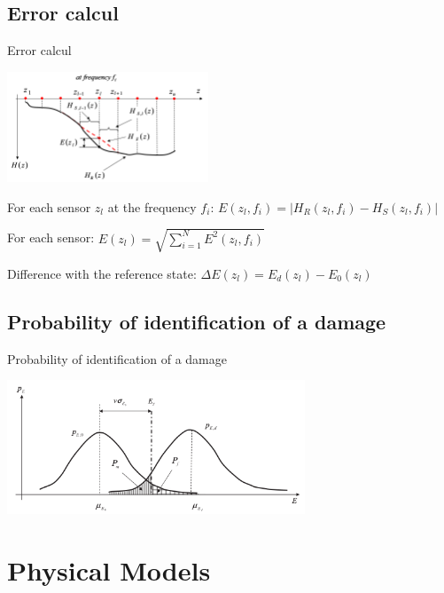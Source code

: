 \documentclass{beamer}
\begin{document}
\subsection{Error calcul}
\begin{frame}{Error calcul}

\begin{center}
\includegraphics[width=6cm]{images/interpolation.png}
\end{center}

For each sensor $z_l$ at the frequency $f_i$:
$E(z_l,f_i) = | H_R(z_l,f_i) - H_S(z_l,f_i) |$


\pause

For each sensor:
$E(z_l) = \sqrt{  \sum\limits_{i=1}^N  E^2(z_l,f_i) }$

\pause

Difference with the reference state:
$\Delta E(z_l) = E_d(z_l) - E_0(z_l)$

\end{frame}

\subsection{Probability of identification of a damage}
\begin{frame}{Probability of identification of a damage}
\begin{center}
\includegraphics[height=4cm]{images/gaussiennes.png}
\end{center}
\end{frame}





\section{Physical Models}
\end{document}
